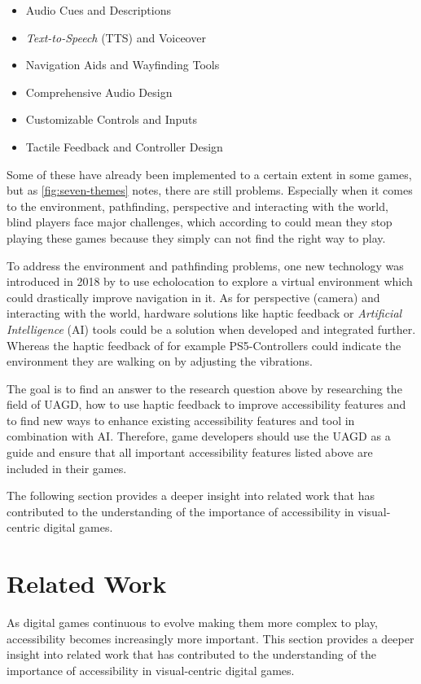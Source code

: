 \documentclass[sigconf,natbib=false,10pt]{acmart}
\begin{document}
	\begin{itemize}
		\setlength\itemsep{0.5em}
		\item Audio Cues and Descriptions
		\item \emph{Text-to-Speech} (TTS) and Voiceover
		\item Navigation Aids and Wayfinding Tools
		\item Comprehensive Audio Design
		\item Customizable Controls and Inputs
		\item Tactile Feedback and Controller Design
	\end{itemize}
    
    Some of these have already been implemented to a certain extent in some games, but as \autoref{fig:seven-themes} notes, there are still problems.
    Especially when it comes to the environment, pathfinding, perspective and interacting with the world, blind players face major challenges, which according to \textcite{goncalves_my_2023} could mean they stop playing these games because they simply can not find the right way to play.
    
    To address the environment and pathfinding problems, one new technology was introduced in 2018 by \textcite{andrade_echo-house_2018} to use echolocation to explore a virtual environment which could drastically improve navigation in it.
    As for perspective (camera) and interacting with the world, hardware solutions like haptic feedback or \emph{Artificial Intelligence} (AI) tools could be a solution when developed and integrated further.
    Whereas the haptic feedback \cite{bello_haptics_2016} of for example PS5-Controllers \cite{akyaman_anticipated_2021, chen_gamepad_2024} could indicate the environment they are walking on by adjusting the vibrations.
    
    The goal is to find an answer to the research question above by researching the field of UAGD, how to use haptic feedback to improve accessibility features and to find new ways to enhance existing accessibility features and tool in combination with AI.
    Therefore, game developers should use the UAGD as a guide and ensure that all important accessibility features listed above are included in their games.
    
    The following section provides a deeper insight into related work that has contributed to the understanding of the importance of accessibility in visual-centric digital games.
	
	\section{Related Work} \label{sec:relatedWork}
	As digital games continuous to evolve making them more complex to play, accessibility becomes increasingly more important.
	This section provides a deeper insight into related work that has contributed to the understanding of the importance of accessibility in visual-centric digital games.
	
\end{document}
